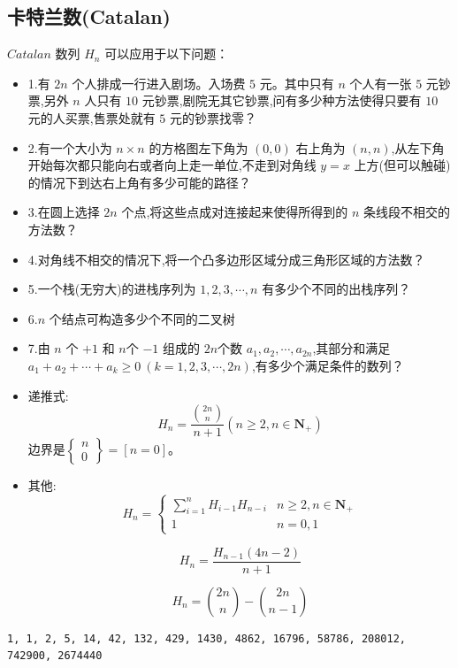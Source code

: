 \subsection{卡特兰数(Catalan)}
$Catalan$ 数列 $H_n$ 可以应用于以下问题：
\begin{itemize}
    \item 1.有 $2n$ 个人排成一行进入剧场。入场费 $5$ 元。其中只有 $n$ 个人有一张 $5$ 元钞票,另外 $n$ 人只有 $10$ 元钞票,剧院无其它钞票,问有多少种方法使得只要有 $10$ 元的人买票,售票处就有 $5$ 元的钞票找零？
	\item 2.有一个大小为 $n\times n$ 的方格图左下角为 $(0, 0)$ 右上角为 $(n, n)$,从左下角开始每次都只能向右或者向上走一单位,不走到对角线 $y=x$ 上方(但可以触碰)的情况下到达右上角有多少可能的路径？
	\item 3.在圆上选择 $2n$ 个点,将这些点成对连接起来使得所得到的 $n$ 条线段不相交的方法数？
	\item 4.对角线不相交的情况下,将一个凸多边形区域分成三角形区域的方法数？
	\item 5.一个栈(无穷大)的进栈序列为 $1,2,3, \cdots ,n$ 有多少个不同的出栈序列？
	\item 6.$n$ 个结点可构造多少个不同的二叉树
	\item 7.由 $n$ 个 $+1$ 和 $n$个 $-1$ 组成的 $2n$个数 $a_1,a_2, \cdots ,a_{2n}$,其部分和满足 $a_1+a_2+ \cdots +a_k \geq 0~(k=1,2,3, \cdots ,2n)$,有多少个满足条件的数列？
\end{itemize}

\begin{itemize}
    \item 递推式:
			$$H_n = \frac{\binom{2n}{n}}{n+1}(n \geq 2, n \in \mathbf{N_{+}})$$
		边界是$\begin{Bmatrix}n\\ 0\end{Bmatrix}=[n=0]$。
	\item 其他:
		$$H_n = \begin{cases}
		    \sum_{i=1}^{n} H_{i-1} H_{n-i} & n \geq 2, n \in \mathbf{N_{+}}\\
		    1 & n = 0, 1
		\end{cases}$$
		 
		$$H_n = \frac{H_{n-1} (4n-2)}{n+1}$$
		
		$$H_n = \binom{2n}{n} - \binom{2n}{n-1}$$
\end{itemize}
\begin{lstlisting}[caption={}]
1, 1, 2, 5, 14, 42, 132, 429, 1430, 4862, 16796, 58786, 208012, 742900, 2674440
\end{lstlisting}

